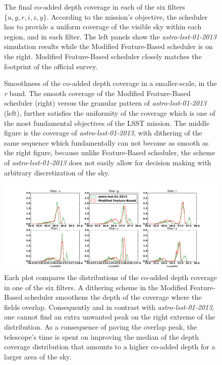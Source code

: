\documentclass[12pt]{aastex62}
\theoremstyle{definition}
\begin{document}
\begin{figure}[h!]
\caption{The final co-added depth coverage in each of the six filters $\{ u, g, r, i, z, y\}$. According to the mission's objective, the scheduler has to provide a uniform coverage of the visible sky within each region, and in each filter. The left panels show the \textit{astro-lsst-01-2013} simulation results while the Modified Feature-Based scheduler is on the right. Modified Feature-Based scheduler closely matches the footprint of the official survey.}
\label{fig_10yrs_skymap}
\end{figure}


\begin{figure}
\caption{Smoothness of the co-added depth coverage in a smaller-scale, in the \textit{r} band. The smooth coverage of the Modified Feature-Based scheduler (right) versus the granular pattern of \textit{astro-lsst-01-2013} (left), further satisfies the uniformity of the coverage which is one of the most fundamental objectives of the LSST mission. The middle figure is the coverage of \textit{astro-lsst-01-2013}, with dithering of the same sequence which fundamentally can not become as smooth as the right figure, because unlike Feature-Based scheduler, the scheme of \textit{astro-lsst-01-2013} does not easily allow for decision making with arbitrary discretization of the sky.}\label{fig_zoomin_r}
\end{figure}



\begin{figure}[h!]
\centering
\includegraphics[width=1.0\linewidth]{Figures/Co_addedHist10yrs.pdf}
\caption{Each plot compares the distributions of the co-added depth coverage in one of the six filters. A dithering scheme in the Modified Feature-Based scheduler smoothens the depth of the coverage where the fields overlap. Consequently and in contrast with \textit{astro-lsst-01-2013}, one cannot find an extra unwanted peak on the right extreme of the distribution. As a consequence of paving the overlap peak, the telescope's time is spent on improving the median of the depth coverage distribution that amounts to a higher co-added depth for a larger area of the sky.}
\label{fig_10yrs_hist}
\end{figure}
\end{document}

